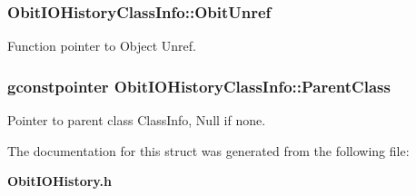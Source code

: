 \subsubsection{ {\bf Obit\-IOHistory\-Class\-Info::Obit\-Unref}}\label{structObitIOHistoryClassInfo_o11}


Function pointer to Object Unref. 

\subsubsection{\setlength{\rightskip}{0pt plus 5cm}gconstpointer {\bf Obit\-IOHistory\-Class\-Info::Parent\-Class}}\label{structObitIOHistoryClassInfo_o3}


Pointer to parent class Class\-Info, Null if none. 



The documentation for this struct was generated from the following file:\begin{CompactItemize}
\item 
{\bf Obit\-IOHistory.h}\end{CompactItemize}
